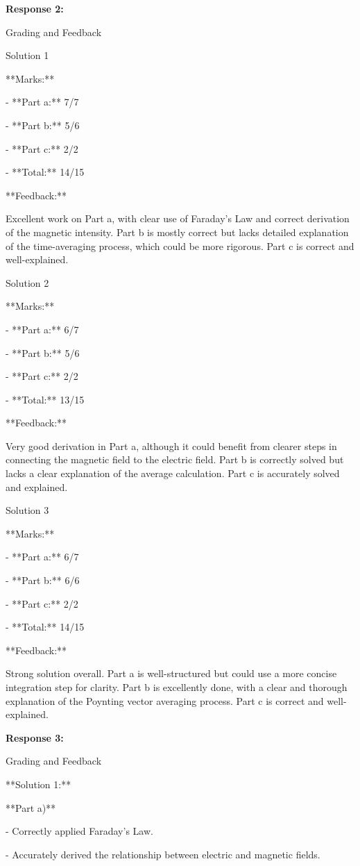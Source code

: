 \documentclass[a4paper,11pt]{article}
\begin{document}
\bigskip
\textbf{Response 2:}

Grading and Feedback

Solution 1

**Marks:**

- **Part a:** 7/7

- **Part b:** 5/6

- **Part c:** 2/2

- **Total:** 14/15

**Feedback:**

Excellent work on Part a, with clear use of Faraday’s Law and correct derivation of the magnetic intensity. Part b is mostly correct but lacks detailed explanation of the time-averaging process, which could be more rigorous. Part c is correct and well-explained.

Solution 2

**Marks:**

- **Part a:** 6/7

- **Part b:** 5/6

- **Part c:** 2/2

- **Total:** 13/15

**Feedback:**

Very good derivation in Part a, although it could benefit from clearer steps in connecting the magnetic field to the electric field. Part b is correctly solved but lacks a clear explanation of the average calculation. Part c is accurately solved and explained.

Solution 3

**Marks:**

- **Part a:** 6/7

- **Part b:** 6/6

- **Part c:** 2/2

- **Total:** 14/15

**Feedback:**

Strong solution overall. Part a is well-structured but could use a more concise integration step for clarity. Part b is excellently done, with a clear and thorough explanation of the Poynting vector averaging process. Part c is correct and well-explained.

\bigskip
\textbf{Response 3:}

Grading and Feedback

**Solution 1:**

**Part a)**

- Correctly applied Faraday's Law.

- Accurately derived the relationship between electric and magnetic fields.
\end{document}
